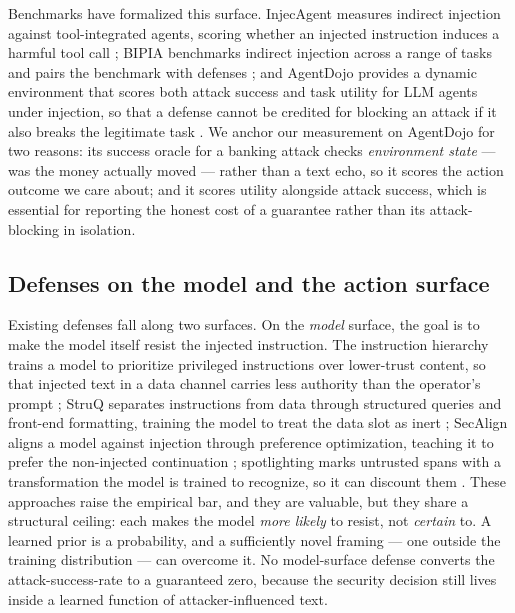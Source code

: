 \documentclass[sigconf,anonymous,review]{acmart}
\begin{document}
Benchmarks have formalized this surface. InjecAgent measures indirect injection against tool-integrated agents, scoring whether an injected instruction induces a harmful tool call \citep{zhan-2024-injecagent}; BIPIA benchmarks indirect injection across a range of tasks and pairs the benchmark with defenses \citep{yi-2023-bipia}; and AgentDojo provides a dynamic environment that scores both attack success and task utility for LLM agents under injection, so that a defense cannot be credited for blocking an attack if it also breaks the legitimate task \citep{debenedetti-2024-agentdojo}. We anchor our measurement on AgentDojo for two reasons: its success oracle for a banking attack checks \textit{environment state} --- was the money actually moved --- rather than a text echo, so it scores the action outcome we care about; and it scores utility alongside attack success, which is essential for reporting the honest cost of a guarantee rather than its attack-blocking in isolation.


\subsection{Defenses on the model and the action surface}
Existing defenses fall along two surfaces. On the \textit{model} surface, the goal is to make the model itself resist the injected instruction. The instruction hierarchy trains a model to prioritize privileged instructions over lower-trust content, so that injected text in a data channel carries less authority than the operator's prompt \citep{wallace-2024-instruction-hierarchy}; StruQ separates instructions from data through structured queries and front-end formatting, training the model to treat the data slot as inert \citep{chen-2024-struq}; SecAlign aligns a model against injection through preference optimization, teaching it to prefer the non-injected continuation \citep{chen-2024-secalign}; spotlighting marks untrusted spans with a transformation the model is trained to recognize, so it can discount them \citep{hines-2024-spotlighting}. These approaches raise the empirical bar, and they are valuable, but they share a structural ceiling: each makes the model \textit{more likely} to resist, not \textit{certain} to. A learned prior is a probability, and a sufficiently novel framing --- one outside the training distribution --- can overcome it. No model-surface defense converts the attack-success-rate to a guaranteed zero, because the security decision still lives inside a learned function of attacker-influenced text.
\end{document}
